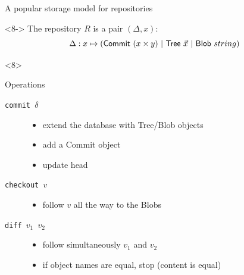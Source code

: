 \documentclass[ignorenonframetext,red]{beamer}
\begin{document}
\begin{frame}{A popular storage model for repositories}
\begin{onlyenv}
\begin{center}
    \end{center}
  \end{onlyenv}
  \begin{onlyenv}<8->
    The repository $R$ is a pair $(\Delta, x)$:
    \[ \Delta : x \mapsto (\mathsf{Commit}\ (x\times y) \gor \mathsf{Tree}\ \vec x
    \gor \mathsf{Blob}\ string)\]
    \begin{overlayarea}{\textwidth}{12em}
      \begin{onlyenv}<8>
        \begin{block}{Operations}
          \begin{description}
          \item[\texttt{commit $\delta$}]
            \begin{itemize}
            \item extend the database with \textsf{Tree}/\textsf{Blob}
              objects
            \item add a \textsf{Commit} object
            \item update head
            \end{itemize}
          \item[\texttt{checkout $v$}]
            \begin{itemize}
            \item follow $v$ all the way to the \textsf{Blob}s
            \end{itemize}
          \item[\texttt{diff $v_1$ $v_2$}]
            \begin{itemize}
            \item follow simultaneously $v_1$ and $v_2$
            \item if object names are equal, stop (content is equal)

\end{itemize}
\end{description}
\end{block}
\end{onlyenv}
\end{overlayarea}
\end{onlyenv}
\end{frame}
\end{document}
